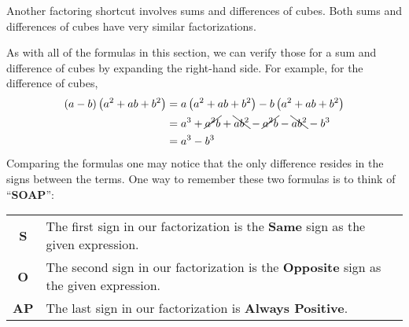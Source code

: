 \documentclass[12pt]{book}
\theoremstyle{definition}
\begin{document}
Another factoring shortcut involves sums and differences of cubes.  Both sums and differences of cubes have very similar factorizations.
\begin{center}
\end{center}
As with all of the formulas in this section, we can verify those for a sum and difference of cubes by expanding the right-hand side.  For example, for the difference of cubes, 
\begin{equation*}
\begin{split}
\left(a-b\right)\left(a^2+ab+b^2\right)&= a\left(a^2+ab+b^2\right)-b\left(a^2+ab+b^2\right)\\
&=a^3+\cancel{a^2b}+\bcancel{ab^2}-\cancel{a^2b}-\bcancel{ab^2}-b^3\\
&=a^3-b^3
\end{split}
\end{equation*}
\newpage
Comparing the formulas one may notice that the only difference resides in the signs between the terms. One way to remember these two formulas is to think of ``{\bf SOAP}'':
\begin{center}
\begin{tabular}{cl}
{\bf S} & The first sign in our factorization is the {\bf Same} sign as the given expression.\\
{\bf O} & The second sign in our factorization is the {\bf Opposite} sign as the given expression.\\
{\bf AP} & The last sign in our factorization is {\bf Always Positive}.
\end{tabular}
\end{center}
\end{document}
